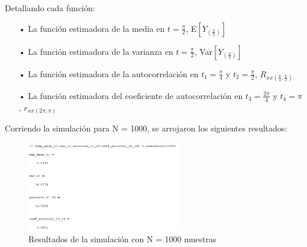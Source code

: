 Detallando cada función:
\begin{enumerate}
\item[•] La función estimadora de la media en $t = \frac{\pi}{2}$, E$\left[ Y_{(\frac{\pi}{2})}\right]$


\item[•] La función estimadora de la varianza en $t = \frac{\pi}{2}$, Var$\left[Y_{(\frac{\pi}{2})}\right]$


\item[•] La función estimadora de la autocorrelación en $t_1 = \frac{\pi}{4}$ y $t_2 = \frac{\pi}{2}$, $R_{xx(\frac{\pi}{4},\frac{\pi}{2})}$


\item[•] La función estimadora del coeficiente de autocorrelación en $t_3 = \frac{2\pi}{4}$ y $t_4 = \pi$, $r_{xx(2\pi,\pi)}$

\end{enumerate}

Corriendo la simulación para N = 1000, se arrojaron los siguientes resultados:
\begin{figure}[H]
\centering
	\includegraphics[width=0.6\textwidth, trim = {0 0 0 0},clip]{./ImagenesEjercicio1/result.png}
	\caption{Resultados de la simulación con N = 1000 muestras}
	\label{fig:result}
\end{figure}

